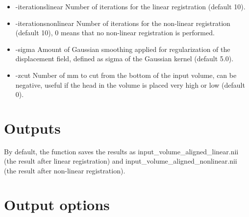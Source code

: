 \begin{itemize}

\item -iterationslinear          
\newline \newline Number of iterations for the linear registration (default 10). 

\newpage

\item -iterationsnonlinear       
\newline \newline Number of iterations for the non-linear registration (default 10), 0 means that no non-linear registration is performed. 


\item -sigma                    
\newline \newline Amount of Gaussian smoothing applied for regularization of the displacement field, defined as sigma of the Gaussian kernel (default 5.0).

\item -zcut                      
\newline \newline Number of mm to cut from the bottom of the input volume, can be negative, useful if the head in the volume is placed very high or low (default 0). 

\end{itemize}

\section{Outputs}

By default, the function saves the results as input\_volume\_aligned\_linear.nii (the result after linear registration) and input\_volume\_aligned\_nonlinear.nii (the result after non-linear registration). 

\newpage 

\section{Output options}

